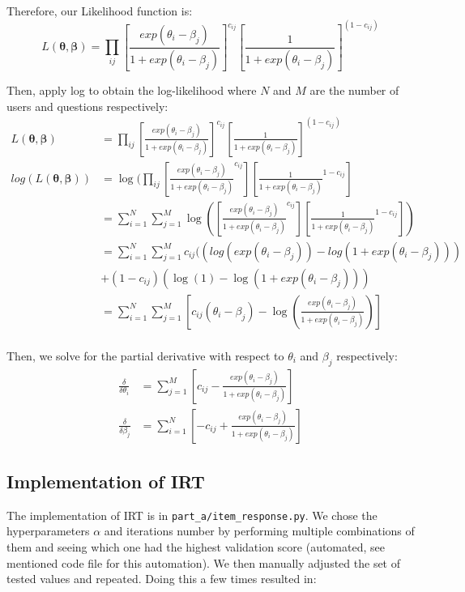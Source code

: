 \documentclass{article}
\begin{document}
    Therefore, our Likelihood function is:
    \[L(\bm{\theta}, \bm{\beta}) =\prod_{ij}[\frac{exp(\theta_{i} - \beta_{j})}{1+exp(\theta_{i} - \beta_{j})}]^{c_{ij}}[\frac{1}{1 + exp(\theta_{i} - \beta_{j})}]^{(1-c_{ij})}\]

    Then, apply log to obtain the log-likelihood where $N$ and $M$ are the number of users and questions respectively:
    \begin{align*}
        L(\bm{\theta}, \bm{\beta}) &=\prod_{ij}[\frac{exp(\theta_{i} - \beta_{j})}{1+exp(\theta_{i} - \beta_{j})}]^{c_{ij}}[\frac{1}{1 + exp(\theta_{i} - \beta_{j})}]^{(1-c_{ij})} \\
        log(L(\bm{\theta}, \bm{\beta})) &= \log(\prod_{ij}[\frac{exp(\theta_{i} - \beta_{j})}{1+exp(\theta_{i} - \beta_{j})}^{c_{ij}}][\frac{1}{1 + exp(\theta_{i} - \beta_{j})}^{1-c_{ij}}] \\
        &=\sum_{i=1}^{N} \sum_{j=1}^{M} \log([\frac{exp(\theta_{i} - \beta_{j})}{1+exp(\theta_{i} - \beta_{j})}^{c_{ij}}][\frac{1}{1 + exp(\theta_{i} - \beta_{j})}^{1-c_{ij}}]) \\
        &=\sum_{i=1}^{N} \sum_{j=1}^{M} c_{ij}((log(exp(\theta_{i} - \beta_{j})) - log(1 + exp(\theta_{i} - \beta_{j}))) \\
        &+ (1 - c_{ij})(\log(1) - \log(1 + exp(\theta_{i} - \beta_{j}))) \\
        &=\sum_{i=1}^{N} \sum_{j=1}^{M} [c_{ij}(\theta_{i} - \beta_{j}) - \log(\frac{exp(\theta_{i} - \beta_{j})}{1+exp(\theta_{i} - \beta_{j})})] \\
    \end{align*}

    Then, we solve for the partial derivative with respect to $\theta_i$ and $\beta_j$ respectively:
    \begin{align*}
        \frac{\delta}{\delta\theta_{i}} &=  \sum_{j=1}^{M}{[c_{ij} - \frac{exp(\theta_{i} - \beta_{j})}{1+exp(\theta_{i} - \beta_{j})}]} \\
        \frac{\delta}{\delta\beta_{j}} &= \sum_{i=1}^{N}{[-c_{ij} + \frac{exp(\theta_{i} - \beta_{j})}{1+exp(\theta_{i} - \beta_{j})}]}
    \end{align*}
    
    \subsection{Implementation of IRT}
    The implementation of IRT is in \verb|part_a/item_response.py|. We chose the hyperparameters $\alpha$ and iterations number by performing multiple combinations of them and seeing which one had the highest validation score (automated, see mentioned code file for this automation). We then manually adjusted the set of tested values and repeated. Doing this a few times resulted in:
\end{document}
